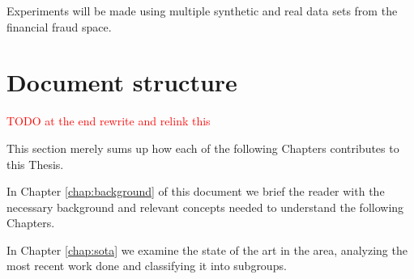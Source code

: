 Experiments will be made using multiple synthetic and real data sets from the financial fraud space.

\section{Document structure} 

\textcolor{red}{TODO at the end rewrite and relink this}

This section merely sums up how each of the following Chapters contributes to this Thesis.

In Chapter \ref{chap:background} of this document we brief the reader with the necessary background and relevant concepts needed to understand the following Chapters.

In Chapter \ref{chap:sota} we examine the state of the art in the area, analyzing the most recent work done and classifying it into subgroups.


